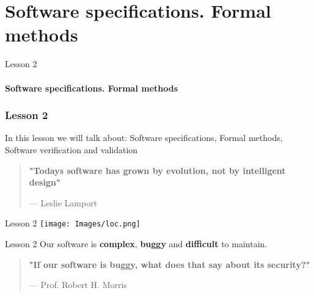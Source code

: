 \documentclass[aspectratio=1610]{beamer}
\begin{document}
\section{Software specifications. Formal methods}

\begin{frame}
\begin{center}
\Huge Lesson 2\\~\\
\textbf{Software specifications. Formal methods}
\end{center}
\end{frame}


\begin{frame}
\frametitle{Lesson 2}

\Huge In this lesson we will talk about:
 \alert{Software specifications},
 \alert{Formal methods},
 \alert{Software verification and validation}
\end{frame}



\begin{frame}
\begin{center}
\Huge
\begin{quote}
\textbf{"Todays software has grown by evolution, not by intelligent design"}
\begin{flushright}
{--- Leslie Lamport}	
\end{flushright}
\end{quote}
\end{center}
\end{frame}


\begin{frame}{Lesson 2}{}
\texttt{[image: Images/loc.png]}
\end{frame}


\begin{frame}{Lesson 2}{}
\Huge
 Our software is \textbf{complex}, \textbf{buggy} and \textbf{difficult} to maintain.
 \end{frame}


\begin{frame}
\begin{center}
\Huge
\begin{quote}
\textbf{"If our software is buggy, what does
that say about its security?"}
\begin{flushright}
{--- Prof. Robert H. Morris}
\end{flushright}
\end{quote}
\end{center}
\end{frame}
\end{document}
